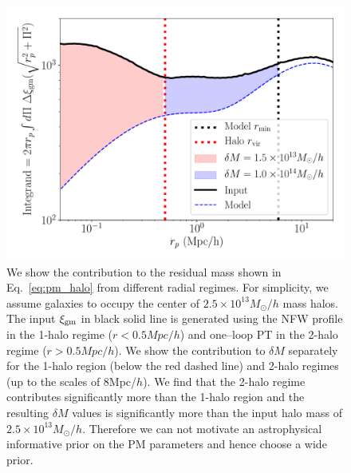 \documentclass[fleqn,usenatbib]{mnras}
\begin{document}
\begin{figure}
\includegraphics[width=\columnwidth]{figs/PM_contribution_radial.pdf}
\caption[]{We show the contribution to the residual mass shown in Eq.~\ref{eq:pm_halo} from different radial regimes. For simplicity, we assume galaxies to occupy the center of $2.5 \times 10^{13} M_{\odot}/h$ mass halos. The input $\xi_{\rm gm}$ in black solid line is generated using the NFW profile in the 1-halo regime ($r < 0.5 Mpc/h$) and one--loop PT in the 2-halo regime ($r > 0.5 Mpc/h$). We show the contribution to $\delta M$ separately for the 1-halo region (below the red dashed line) and 2-halo regimes (up to the scales of 8Mpc/$h$). We find that the 2-halo regime contributes significantly more than the 1-halo region and the resulting $\delta M$ values is significantly more than the input halo mass of $2.5 \times 10^{13} M_{\odot}/h$. Therefore we can not motivate an astrophysical informative prior on the PM parameters and hence choose a wide prior. 
}
\label{fig:pm_prior}
\end{figure}
\end{document}
